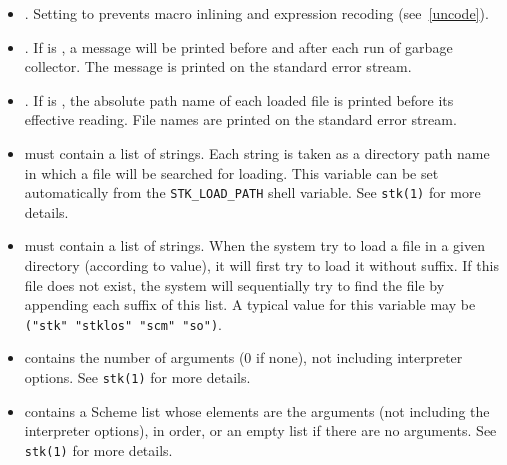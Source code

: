 \begin{itemize}

\item {\tt{}}. Setting
    {\tt {}} to {\schtrue} prevents macro inlining and 
    expression recoding (see~\ref{uncode}).
        
\item {\tt{}}. If 
      {\tt{}} is {\schtrue}, a message will be printed before
      and after each run of garbage collector. The message is printed on the
      standard error stream.
     
\item {\tt{}}. If 
      {\tt{}} is {\schtrue}, the absolute path name of
      each loaded file is printed before its effective reading. File names
      are printed on the standard error stream.
      
\item {\tt{}} must
      contain a list of strings. Each string is taken as a directory
      path name in which a file will be searched for loading. This
      variable can be set automatically from the {\tt STK\_LOAD\_PATH}
      shell variable. See {\tt stk(1)} for more details.

\item  {\tt{}}
      must contain a list of strings. When the system try to load a
      file in a given directory (according to {\tt{}}
      value), it will first try to load it without suffix. If this
      file does not exist, the system will sequentially try to find the file by
      appending each suffix of this list. A typical value for this
      variable may be {\tt ("stk" "stklos" "scm" "so")}.


\item {\tt{}} contains the
       number of arguments  (0 if none), not including interpreter
       options. See {\tt stk(1)} for more details.

\item {\tt{}} contains a Scheme 
      list whose elements are the arguments (not including the interpreter
      options), in order, or an empty list if there are no arguments.
      See {\tt stk(1)} for more details.


\end{itemize}
